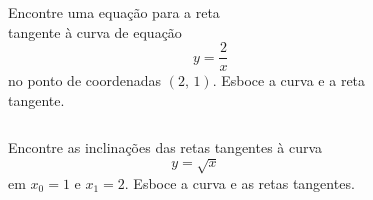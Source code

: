 \begin{frame}
  \begin{columns}[onlytextwidth]
    \begin{column}{0.49\textwidth}\vspace{-0.5cm}
      \begin{example}
        Encontre uma equação para a reta \\tangente à curva de equação
        \begin{equation*}
          y = \frac{2}{x}
        \end{equation*}
        no ponto de coordenadas $(2,\,1)$. Esboce a curva e a reta tangente.
      \end{example}
    \end{column}
    \begin{column}{0.49\textwidth}
      \begin{figure}
      \end{figure}
    \end{column}
  \end{columns}
\end{frame}

\begin{frame}
  \begin{columns}[onlytextwidth]
    \begin{column}{0.49\textwidth}\vspace{-0.5cm}
      \begin{example}
        Encontre as inclinações das retas tangentes à curva
        \begin{equation*}
          y = \sqrt{x}
        \end{equation*}
        em $x_{0} = 1$ e $x_{1} = 2$. Esboce a curva e as retas tangentes.
      \end{example}
    \end{column}
    \begin{column}{0.49\textwidth}
      \begin{figure}
      \end{figure}
    \end{column}
  \end{columns}
\end{frame}
